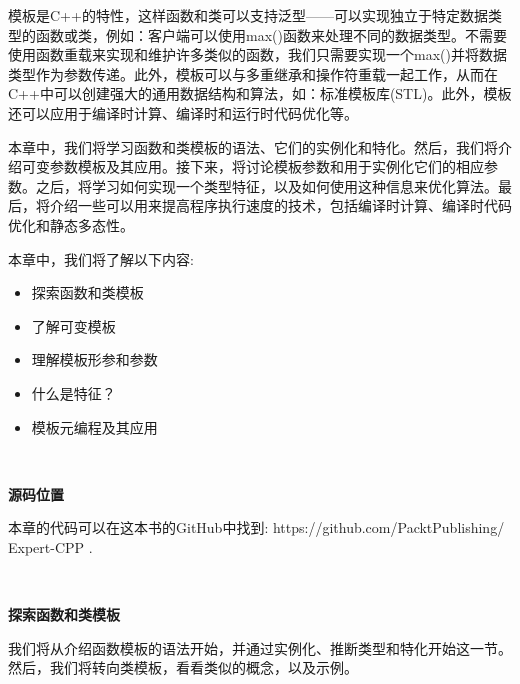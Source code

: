 模板是C++的特性，这样函数和类可以支持泛型——可以实现独立于特定数据类型的函数或类，例如：客户端可以使用max()函数来处理不同的数据类型。不需要使用函数重载来实现和维护许多类似的函数，我们只需要实现一个max()并将数据类型作为参数传递。此外，模板可以与多重继承和操作符重载一起工作，从而在C++中可以创建强大的通用数据结构和算法，如：标准模板库(STL)。此外，模板还可以应用于编译时计算、编译时和运行时代码优化等。 \par
本章中，我们将学习函数和类模板的语法、它们的实例化和特化。然后，我们将介绍可变参数模板及其应用。接下来，将讨论模板参数和用于实例化它们的相应参数。之后，将学习如何实现一个类型特征，以及如何使用这种信息来优化算法。最后，将介绍一些可以用来提高程序执行速度的技术，包括编译时计算、编译时代码优化和静态多态性。\par
本章中，我们将了解以下内容: \par

\begin{itemize}
	\item 探索函数和类模板
	\item 了解可变模板
	\item 理解模板形参和参数
	\item 什么是特征？
	\item 模板元编程及其应用
\end{itemize}

\noindent\textbf{}\ \par
\textbf{源码位置} \ \par
本章的代码可以在这本书的GitHub中找到: https:/​/​github.com/​PacktPublishing/​Expert-​CPP . \par

\noindent\textbf{}\ \par
\textbf{探索函数和类模板} \ \par
我们将从介绍函数模板的语法开始，并通过实例化、推断类型和特化开始这一节。然后，我们将转向类模板，看看类似的概念，以及示例。\par

